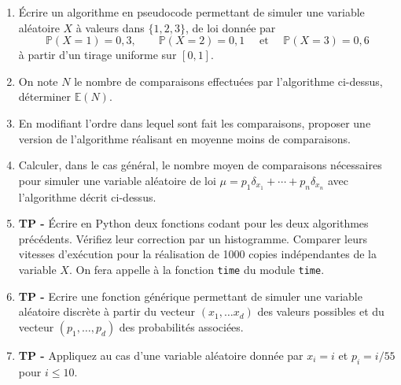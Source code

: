 \documentclass{exercices}
\begin{document}
\begin{exercice}
\begin{enumerate}
\item Écrire un algorithme en pseudocode permettant de simuler une variable aléatoire $X$ à valeurs dans $\{1,2,3\}$, de loi donn\'ee par $$\mathbb{P} (X = 1) = 0,3, \qquad \mathbb{P} (X = 2) = 0,1 \quad \text{ et }\quad \mathbb{P} (X = 3) = 0,6$$ à partir d'un tirage uniforme sur $[0,1]$.
\item On note $N$ le nombre de comparaisons effectuées par l'algorithme ci-dessus, déterminer $\mathbb{E}(N)$.
\item En modifiant l'ordre dans lequel sont fait les comparaisons, proposer une version de l'algorithme réalisant en moyenne moins de comparaisons.
\item Calculer, dans le cas général, le nombre moyen de comparaisons nécessaires pour simuler une variable aléatoire de loi $\mu = p_1 \delta_{x_1} + \cdots + p_n \delta_{x_n}$ avec l'algorithme décrit ci-dessus.
\item \textbf{TP -} Écrire en Python deux fonctions codant pour les deux algorithmes précédents. Vérifiez leur correction par un histogramme. Comparer leurs vitesses d'exécution pour la réalisation de 1000 copies indépendantes de la variable $X$.  On fera appelle à la fonction \texttt{time} du module \texttt{time}.
\item\textbf{TP -} Ecrire une fonction générique permettant de simuler une variable aléatoire discrète à partir du vecteur $(x_1, \dots x_d)$ des valeurs possibles et du vecteur $(p_1, \dots, p_d)$ des probabilités associées.
\item \textbf{TP -} Appliquez au cas d'une variable aléatoire donnée par $x_i = i$ et $p_i = i/55$ pour $i \leq 10$.
\end{enumerate}
\end{exercice}

\begin{solution}
\end{solution}
\end{document}
